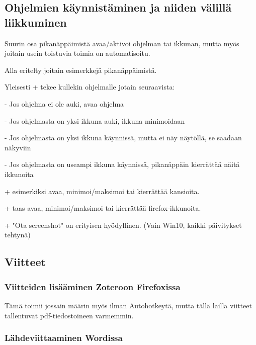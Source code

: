 \documentclass[a5paper,9pt]{scrartcl}
\begin{document}
    \subsection{Ohjelmien käynnistäminen ja niiden välillä liikkuminen}
    
     Suurin osa pikanäppäimistä avaa/aktivoi ohjelman tai ikkunan, mutta myös joitain usein toistuvia toimia on automatisoitu.
    
    \medskip
    
    Alla eritelty joitain esimerkkejä pikanäppäimistä.
    
    Yleisesti + tekee kullekin ohjelmalle jotain seuraavista:
    
    - Jos ohjelma ei ole auki, avaa ohjelma
    
    - Jos ohjelmasta on yksi ikkuna auki, ikkuna minimoidaan
    
    - Jos ohjelmasta on yksi ikkuna käynnissä, mutta ei näy näytöllä, se saadaan näkyviin
    
    - Jos ohjelmasta on useampi ikkuna käynnissä, pikanäppäin kierrättää näitä ikkunoita
    
    \medskip
    
    + esimerkiksi avaa, minimoi/maksimoi tai kierrättää kansioita.
    
     + taas avaa, minimoi/maksimoi tai kierrättää firefox-ikkunoita.
    
    
    + "Ota screenshot" on erityisen hyödyllinen. (Vain Win10, kaikki päivitykset tehtynä)
    
    
      
    \subsection{Viitteet}
    
    \subsubsection{Viitteiden lisääminen Zoteroon Firefoxissa}
    
    Tämä toimii jossain määrin myös ilman Autohotkeytä, mutta tällä lailla viitteet tallentuvat pdf-tiedostoineen varmemmin.
    
    \subsubsection{Lähdeviittaaminen Wordissa}
    
\end{document}
